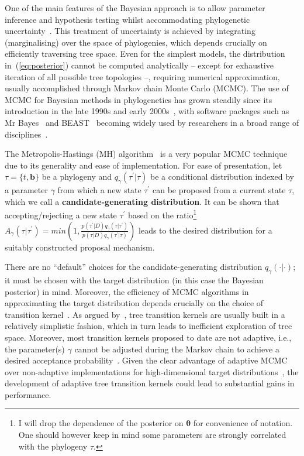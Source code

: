 One of the main features of the Bayesian  approach is to allow parameter inference and hypothesis testing whilst accommodating phylogenetic uncertainty~\citep{Suchard2001, Huelsenbeck2002, Lemey2014, Cybis2015, Baele2015, Baele2017}.
This treatment of uncertainty is achieved by integrating (marginalising) over the space of phylogenies, which depends crucially on efficiently traversing tree space.
Even for the simplest models, the distribution in~(\ref{eq:posterior}) cannot be computed analytically -- except for exhaustive iteration of all possible tree topologies --, requiring numerical approximation, usually accomplished through Markov chain Monte Carlo (MCMC).
The use of MCMC for Bayesian methods in phylogenetics has grown steadily since its introduction in the late 1990s and early 2000s~\citep{Kuhner1995,Sinsheimer1996, Rannala1996, Yang1997, Mau1999, Li2000, Suchard2001,Drummond2002}, with software packages such as Mr Bayes~\citep{Ronquist2012} and BEAST~\citep{Drummond2012} becoming widely used by researchers in a broad range of disciplines~\citep{Murphy2001, Bouckaert2012, Lemey2014}.

The Metropolis-Hastings (MH) algorithm~\citep{Metropolis1953, Hastings1970} is a very popular MCMC technique due to its generality and ease of implementation.
For ease of presentation, let $\tau = \{ t, \boldsymbol b\}$ be a phylogeny and $q_{\gamma}(\tau^\prime|\tau)$ be a conditional distribution indexed by a parameter $\gamma$ from which a new state $\tau^\prime$ can be proposed from a current state $\tau$, which we call a \textbf{candidate-generating distribution}.
It can be shown that accepting/rejecting a new state $\tau^\prime$ based on the ratio\footnote{I will drop the dependence of the posterior on $\boldsymbol\theta$ for convenience of notation. One should however keep in mind some parameters are strongly correlated with the phylogeny $\tau$.} $A_{\gamma}(\tau | \tau^\prime) = min\left(1, \frac{p(\tau^\prime | D)q_{\gamma}(\tau|\tau^\prime)}{p(\tau | D)q_{\gamma}(\tau^\prime|\tau)}\right)$ leads to the desired distribution for a suitably constructed proposal mechanism.

There are no ``default'' choices for the candidate-generating distribution $q_{\gamma}(\cdot|\cdot)$; it must be chosen with the target distribution (in this case the Bayesian posterior) in mind.
Moreover, the efficiency of MCMC algorithms in approximating the target distribution depends crucially on the choice of transition kernel~\citep{Brooks2003,AlAwadhi2004,Yang2013,Thawornwattana2017}.
As argued by~\cite{Hoehna2012}, tree transition kernels are usually built in a relatively simplistic fashion, which in turn leads to inefficient exploration of tree space.
Moreover, most transition kernels proposed to date are not adaptive, i.e., the parameter(s) $\gamma$ cannot be adjusted during the Markov chain to achieve a desired acceptance probability~\citep{Haario2001}.
Given the clear advantage of adaptive MCMC over non-adaptive implementations for high-dimensional target distributions~\citep{Roberts2009, Baele2017}, the development of adaptive tree transition kernels could lead to substantial gains in performance.

